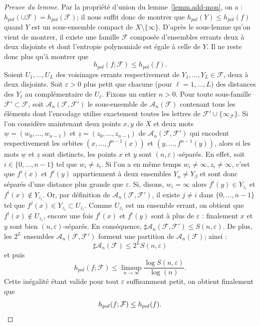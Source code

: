 \documentclass[11pt]{article}
\theoremstyle{definition}
\numberwithin{equation}{section}
\numberwithin{figure}{section}
\numberwithin{table}{section}
\newcommand*\cA{{\mathcal A}}
\newcommand*\cF{{\mathcal F}}
\begin{document}
\begin{proof}[Preuve du lemme]
Par la propriété d'union du lemme~\ref{lemm.add-mon}, on a : $h_{pol}(\cup \cF) = h_{pol}(\cF)$; il nous suffit donc de montrer que $h_{pol}(Y) \leq h_{pol}(f)$ quand $Y$ est un sous-ensemble compact de $X \setminus\{\infty\}$. D'après le sous-lemme qu'on vient de montrer, il existe une famille $\cF$ composée d'ensembles errants deux à deux disjoints et dont l'entropie polynomiale est égale à celle de $Y$. Il ne reste donc plus qu'à montrer que
\[
h_{pol}(f;\cF) \leq h_{pol}(f).
\]
Soient $U_1, \dots, U_L$ des voisinages errants respectivement de $Y_1, \dots, Y_L \in \cF$, deux à deux disjoints. Soit $\varepsilon>0$ plus petit que chacune (pour $\ell=1, \dots, L$) des distances des $Y_\ell$ au complémentaire de $U_\ell$. Fixons un entier $n > 0$. Pour toute sous-famille $\cF' \subset \cF$, soit $\cA_n(\cF,\cF')$ le sous-ensemble de $\cA_n(\cF)$ contenant tous les éléments dont l'encodage utilise exactement toutes les lettres de $\cF' \cup \{\infty_\cF\}$. Si l'on considère maintenant deux points $x,y$ de $X$ et deux mots $\underline{w} = (w_{0}, \dots, w_{n-1})$ et $\underline{z} = (z_{0}, \dots, z_{n-1})$ de $\cA_n(\cF,\cF')$ qui encodent respectivement les orbites $(x, \dots, f^{n-1}(x))$ et $(y, \dots, f^{n-1}(y))$, alors si les mots $\underline{w}$ et $\underline{z}$ sont distincts, les points $x$ et $y$ sont $(n,\varepsilon)$-séparés. En effet, soit $i \in \{0, \dots, n-1\}$ tel que $w_i \neq z_i$. Si l'on a en même temps $w_i \neq \infty, z_i \neq \infty$, c'est que $f^i(x)$ et $f^i(y)$ appartiennent à deux ensembles $Y_{\alpha} \neq Y_\beta$ et sont donc séparés d'une distance plus grande que $\varepsilon$. Si, disons, $w_i=\infty$ alors $f^i(y) \in Y_{z_i}$ et $f^i(x) \not \in Y_{z_i}$. Or, par définition de $\cA_n(\cF,\cF')$, il existe $j \neq i$ dans $\{0, \dots, n-1\}$ tel que $f^j(x) \in Y_{z_i} \subset U_{z_i}$. Comme $U_{z_i}$ est un ensemble errant, on obtient que $f^i(x) \not \in U_{z_i}$, encore une fois $f^i(x)$ et $f^i(y)$ sont à plus de $\varepsilon$ {: finalement} $x$ et $y$ sont bien $(n,\varepsilon)$-séparés. En conséquence, $\sharp \cA_n(\cF,\cF') \leq S(n, \varepsilon)$. De plus, les $2^L$ ensembles $\cA_n(\cF,\cF')$ forment une partition de $\cA_n(\cF)$; ainsi :
\[
\sharp \cA_n(\cF) \leq 2^L S(n, \varepsilon)
\]
et puis
\[
h_{pol}(f; \cF) \leq \limsup_{n \to \infty} \frac{\log S(n, \varepsilon)}{\log (n)}.
\]
Cette inégalité étant valide pour tout $\varepsilon$ suffisamment petit, on obtient finalement que
\[
h_{pol}(f; \cF) \leq h_{pol}(f).\qedhere
\]
\end{proof}
\end{document}

